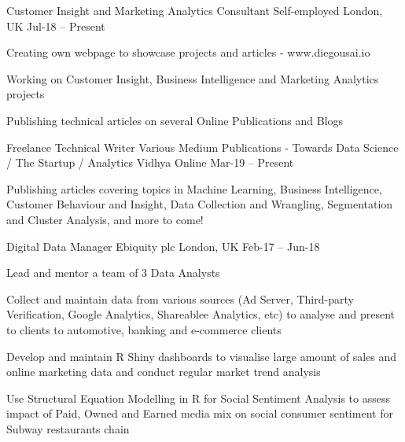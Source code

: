 

\begin{cventries}

  \cventry
    {Customer Insight and Marketing Analytics Consultant} %
    {Self-employed} %
    {London, UK} %
    {Jul-18 – Present} %
    {
      \begin{cvitems} %
        \item {Creating own webpage to showcase projects and articles - www.diegousai.io}
        \item {Working on Customer Insight, Business Intelligence and Marketing Analytics projects}
        \item {Publishing technical articles on several Online Publications and Blogs}
      \end{cvitems}
    }

  \cventry
    {Freelance Technical Writer} %
    {Various Medium Publications - Towards Data Science / The Startup / Analytics Vidhya} %
    {Online} %
    {Mar-19 – Present} %
    {
      \begin{cvitems} %
        \item {Publishing articles covering topics in Machine Learning, Business Intelligence, Customer Behaviour and Insight, Data Collection and Wrangling, Segmentation and Cluster Analysis, and more to come!}
      \end{cvitems}
    }

  \cventry
    {Digital Data Manager} %
    {Ebiquity plc} %
    {London, UK} %
    {Feb-17 – Jun-18} %
    {
      \begin{cvitems} %
        \item {Lead and mentor a team of 3 Data Analysts}
        \item {Collect and maintain data from various sources (Ad Server, Third-party Verification, Google Analytics, Shareablee Analytics, etc) to analyse and present to clients to automotive, banking and e-commerce clients}
        \item {Develop and maintain R Shiny dashboards to visualise large amount of sales and online marketing data and conduct regular market trend analysis}
        \item {Use Structural Equation Modelling in R for Social Sentiment Analysis to assess impact of Paid, Owned and Earned media mix on social consumer sentiment for Subway restaurants chain}
      \end{cvitems}
    }


\end{cventries}
